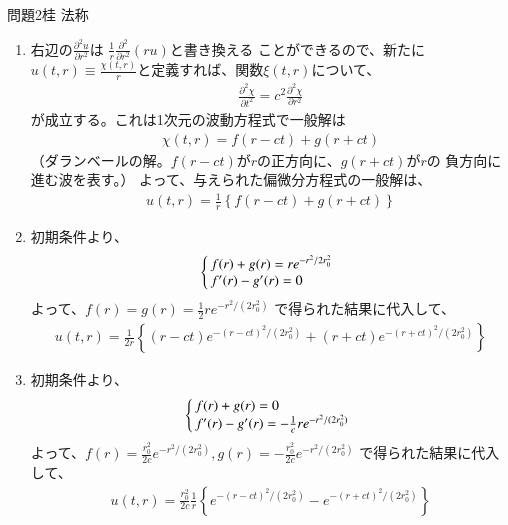 \documentclass[fleqn]{jbook}
\begin{document}
\begin{answer}{問題2}{桂 法称}
\begin{enumerate}
\item 右辺の$\displaystyle \frac{\partial^2 u}{\partial r^2}$は
$\displaystyle \frac{1}{r}\frac{\partial^2}{\partial r^2}(ru)$と書き換える
ことができるので、新たに$\displaystyle u(t, r) \equiv 
\frac{\chi(t, r)}{r}$と定義すれば、関数$\xi(t, r)$について、
\begin{eqnarray*}
\frac{\partial^2 \chi}{\partial t^2} = c^2 \frac{\partial^2 \chi}{\partial r^2}
\end{eqnarray*}
が成立する。これは1次元の波動方程式で一般解は
\begin{eqnarray*}
\chi(t, r) = f(r - ct) + g(r + ct)
\end{eqnarray*}
（ダランベールの解。$f(r - ct)$が$r$の正方向に、$g(r + ct)$が$r$の
負方向に進む波を表す。）
よって、与えられた偏微分方程式の一般解は、
\begin{eqnarray*}
u(t, r) = \frac{1}{r} \left\{ f(r - ct) + g(r + ct) \right\}
\end{eqnarray*}

\item 初期条件より、
\[
\left\{
\begin{array}{@{\,}ll}
f(r) + g(r) = r e^{-r^2/2r_0^2} \\
f'(r) - g'(r) = 0
\end{array}
\right.
\]
よって、$\displaystyle f(r) = g(r) = \frac{1}{2}r e^{-r^2/(2r_0^2)}$
で得られた結果に代入して、
\begin{eqnarray*}
u(t, r) = \frac{1}{2r} \left\{ (r - ct)e^{-(r-ct)^2/(2r_0^2)} 
+ (r + ct)e^{-(r+ct)^2/(2r_0^2)} \right\}
\end{eqnarray*}

\item 初期条件より、
\[
\left\{
\begin{array}{@{\,}ll}
f(r) + g(r) = 0\\
f'(r) - g'(r) = -\frac{1}{c}r e^{-r^2/(2r_0^2)}
\end{array}
\right.
\]
よって、$\displaystyle f(r) = \frac{r_0^2}{2c}e^{-r^2/(2r_0^2)}, 
g(r) = -\frac{r_0^2}{2c}e^{-r^2/(2r_0^2)}$
で得られた結果に代入して、
\begin{eqnarray*}
u(t, r) = \frac{r_0^2}{2c}\frac{1}{r} \left\{ e^{-(r-ct)^2/(2r_0^2)} 
- e^{-(r+ct)^2/(2r_0^2)} \right\}
\end{eqnarray*}


\end{enumerate}
\end{answer}
\end{document}
